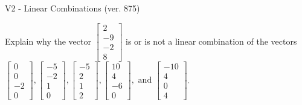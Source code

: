\begin{exercise}
  \begin{exerciseTitle}V2 - Linear Combinations (ver. 875)\end{exerciseTitle}
  \begin{exerciseStatement}
    Explain why the vector \(\left[\begin{array}{c}
2 \\
-9 \\
-2 \\
8
\end{array}\right]\)  is or is not a linear 
	combination of the vectors \(\left[\begin{array}{c}
0 \\
0 \\
-2 \\
0
\end{array}\right] , \left[\begin{array}{c}
-5 \\
-2 \\
1 \\
0
\end{array}\right] , \left[\begin{array}{c}
-5 \\
2 \\
1 \\
2
\end{array}\right] , \left[\begin{array}{c}
10 \\
4 \\
-6 \\
0
\end{array}\right] , \text{ and } \left[\begin{array}{c}
-10 \\
4 \\
0 \\
4
\end{array}\right]\).
	



\end{exerciseStatement}
\end{exercise}
